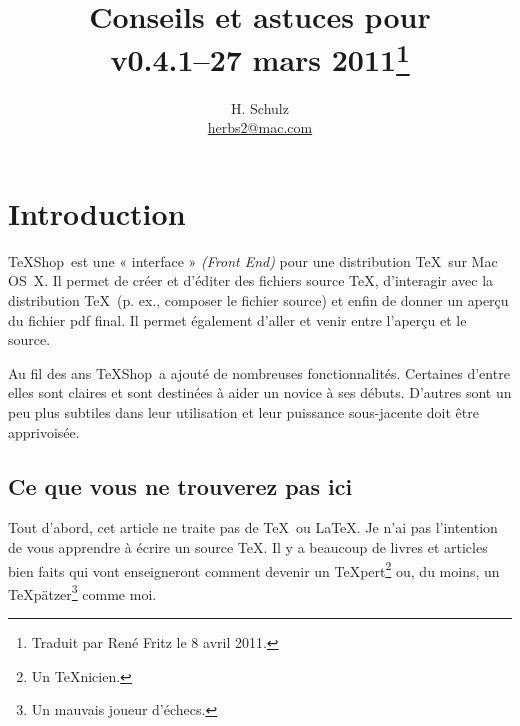 \documentclass[11pt,french]{article}
\title{Conseils et astuces pour \TS\\\small v0.4.1--27 mars 2011\thanks{Traduit par René Fritz le 8 avril 2011.}}
\author{H. Schulz\\\small\href{mailto:herbs2@mac.com}{herbs2@mac.com}}
\date{}
\newcommand{\TS}{\textsf{\TeX Shop}}
\newcommand{\acr}[1]{\textsf{#1}}
\begin{document}
\maketitle

\tableofcontents

\newpage

\section{Introduction}

\TS\ est une « interface » \emph{(Front End)} pour une distribution \TeX\ sur Mac OS~X. Il permet de créer et d'éditer des fichiers source \TeX{}, d'interagir avec la distribution \TeX\ (p. ex., composer le fichier source) et enfin de donner un aperçu du fichier \acr{pdf} final. Il permet également d'aller et venir entre l'aperçu et le source.


Au fil des ans \TS\ a ajouté de nombreuses fonctionnalités. Certaines d'entre elles sont claires et sont destinées à aider un novice à ses débuts. D'autres sont un peu plus subtiles dans leur utilisation et leur puissance sous-jacente doit être apprivoisée.


\subsection{Ce que vous ne trouverez pas ici}

Tout d'abord, cet article ne traite pas de \TeX\ ou \LaTeX. Je n'ai pas l'intention de vous apprendre à écrire un source \TeX{}. Il y a beaucoup de livres et articles bien faits qui vont enseigneront comment devenir un \TeX pert\footnote{Un \TeX nicien.} ou, du moins, un \TeX pätzer\footnote{Un mauvais joueur d'échecs.} comme moi.%
 
\end{document}
